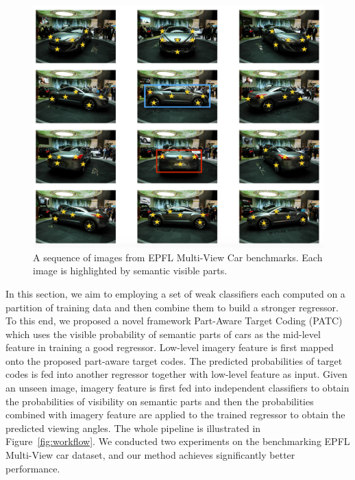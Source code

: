 \documentclass{tutmscthesis}[2010/09/22]
\numberwithin{equation}{section}
\numberwithin{table}{section}
\numberwithin{figure}{section}
\begin{document}
\begin{figure}[h]
\centering
\includegraphics[width=0.98\linewidth]{intro.png}
\caption{A sequence of images from EPFL Multi-View Car benchmarks. Each  image is highlighted by semantic visible parts.}
\label{fig:intro} 
\end{figure}

In this section, we aim to employing a set of weak classifiers each computed on a partition of training data and then combine them to build a stronger regressor. 
To this end, we proposed a novel framework Part-Aware Target Coding (PATC) which uses the visible probability of semantic parts of cars as the mid-level feature in training a good regressor. Low-level imagery feature is first mapped onto the proposed part-aware target codes. 
The predicted probabilities of target codes is fed into another regressor together with low-level feature as input. Given an unseen image, imagery feature is first fed into independent classifiers to obtain the probabilities of visibility on semantic parts and then the probabilities combined with imagery feature are applied to the trained regressor to obtain the predicted viewing angles. The whole pipeline is illustrated in Figure~\ref{fig:workflow}. We conducted two experiments on the benchmarking EPFL Multi-View car dataset, and our method achieves significantly better performance. 
\end{document}
